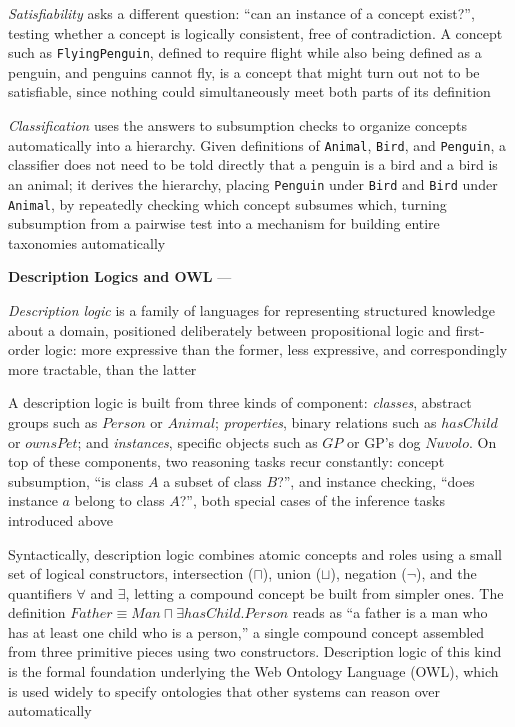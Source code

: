 \emph{Satisfiability} asks a different question: ``can an instance of a
concept exist?'', testing whether a concept is logically consistent, free
of contradiction. A concept such as \texttt{FlyingPenguin}, defined to
require flight while also being defined as a penguin, and penguins cannot
fly, is a concept that might turn out not to be satisfiable, since nothing
could simultaneously meet both parts of its definition

\emph{Classification} uses the answers to subsumption checks to organize
concepts automatically into a hierarchy. Given definitions of
\texttt{Animal}, \texttt{Bird}, and \texttt{Penguin}, a classifier does not
need to be told directly that a penguin is a bird and a bird is an animal;
it derives the hierarchy, placing \texttt{Penguin} under \texttt{Bird} and
\texttt{Bird} under \texttt{Animal}, by repeatedly checking which concept
subsumes which, turning subsumption from a pairwise test into a mechanism
for building entire taxonomies automatically

\textbf{Description Logics and OWL} --- \begin{definition}
  \emph{Description logic} is a family of languages for representing
  structured knowledge about a domain, positioned deliberately between
  propositional logic and first-order logic: more expressive than the
  former, less expressive, and correspondingly more tractable, than the
  latter
\end{definition}
A description logic is built from three kinds of component: \emph{classes},
abstract groups such as $Person$ or $Animal$; \emph{properties}, binary
relations such as $hasChild$ or $ownsPet$; and \emph{instances}, specific
objects such as $GP$ or GP's dog $Nuvolo$. On top of these components, two
reasoning tasks recur constantly: concept subsumption, ``is class $A$ a
subset of class $B$?'', and instance checking, ``does instance $a$ belong
to class $A$?'', both special cases of the inference tasks introduced above

Syntactically, description logic combines atomic concepts and roles using a
small set of logical constructors, intersection ($\sqcap$), union
($\sqcup$), negation ($\neg$), and the quantifiers $\forall$ and $\exists$,
letting a compound concept be built from simpler ones. The definition
$Father \equiv Man \sqcap \exists hasChild.Person$ reads as ``a father is a
man who has at least one child who is a person,'' a single compound concept
assembled from three primitive pieces using two constructors. Description
logic of this kind is the formal foundation underlying the Web Ontology
Language (OWL), which is used widely to specify ontologies that other
systems can reason over automatically

